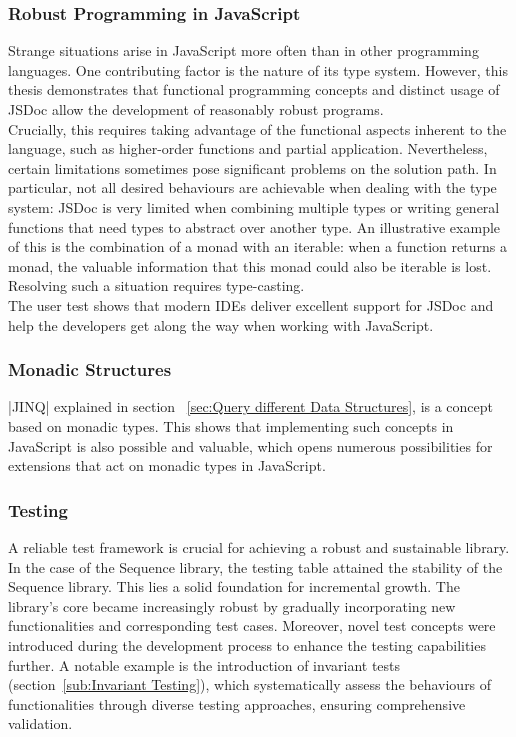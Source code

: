 \subsubsection{Robust Programming in JavaScript}
\label{subsub:Robust Programming in JavaScript}
Strange situations arise in JavaScript more often than in other programming
languages. One contributing factor is the nature of its type system. However,
this thesis demonstrates that functional programming concepts and distinct
usage of JSDoc allow the development of reasonably robust programs.\\
Crucially, this requires taking advantage of the functional aspects inherent to
the language, such as higher-order functions and partial application.
Nevertheless, certain limitations sometimes pose significant problems on the
solution path. In particular, not all desired behaviours are achievable when
dealing with the type system: JSDoc is very limited when combining multiple
types or writing general functions that need types to abstract over another
type. An illustrative example of this is the combination of a monad with an
iterable: when a function returns a monad, the valuable information
that this monad could also be iterable is lost. Resolving such a situation
requires type-casting.\\ 
The user test shows that modern IDEs deliver excellent support for JSDoc and
help the developers get along the way when working with JavaScript.
\subsubsection{Monadic Structures}
\label{subsub:Monadic Structures}
|JINQ| explained in section ~\ref{sec:Query different Data Structures}, is a
concept based on monadic types. This shows that implementing such concepts in
JavaScript is also possible and valuable, which opens numerous possibilities
for extensions that act on monadic types in JavaScript.

\subsubsection{Testing}
\label{subsub:Testing}
A reliable test framework is crucial for achieving a robust and sustainable
library. In the case of the Sequence library, the testing table attained the
stability of the Sequence library. This lies a solid foundation for incremental
growth. The library's core became increasingly robust by gradually
incorporating new functionalities and corresponding test cases. Moreover, novel
test concepts were introduced during the development process to enhance the
testing capabilities further. A notable example is the introduction of
invariant tests (section~\ref{sub:Invariant Testing}), which systematically
assess the behaviours of functionalities through diverse testing approaches,
ensuring comprehensive validation.

